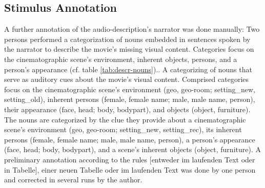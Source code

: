 \documentclass[english]{article}
\begin{document}
\subsection{Stimulus Annotation}
A further annotation of the audio-description's narrator was done manually: Two
persons performed a categorization of nouns embedded in sentences spoken by the
narrator to describe the movie's missing visual content.
Categories focus on the cinematographic scene's environment, inherent objects, persons, and a person's appearance (cf. table \ref{tab:descr-nouns})..
A categorizing of nouns that serve as auditory cues about the movie's visual content. Comprised categories focus on the cinematographic scene's environment (geo, geo-room; setting\_new, setting\_old), inherent persons (female, female name; male, male name, person), their appearance (face, head; body, bodypart), and objects (object, furniture).
The nouns are categorized by the clue they provide about a cinematographic scene's environment  (geo, geo-room; setting\_new, setting\_rec), its inherent persons (female, female name; male, male name, person), a person's appearance (face, head; body, bodypart), and a scene's inherent objects (object, furniture).
A preliminary annotation according to the rules [entweder im laufenden Text oder in Tabelle], einer neuen Tabelle oder im laufenden Text was done by one person and corrected in several runs by the author.
\end{document}
